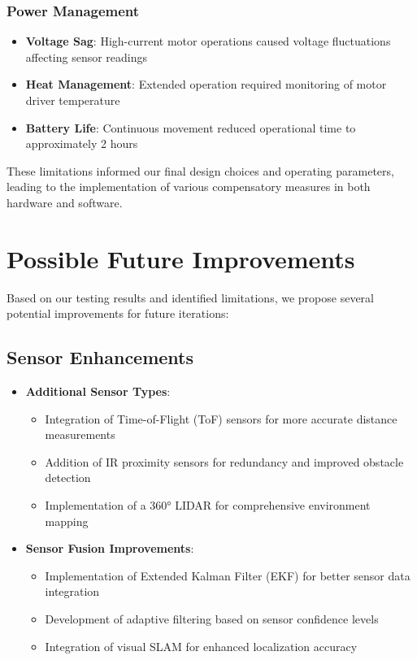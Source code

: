 \documentclass{article}
\begin{document}
\subsubsection{Power Management}
\begin{itemize}
    \item \textbf{Voltage Sag}: High-current motor operations caused voltage fluctuations affecting sensor readings
    \item \textbf{Heat Management}: Extended operation required monitoring of motor driver temperature
    \item \textbf{Battery Life}: Continuous movement reduced operational time to approximately 2 hours
\end{itemize}

These limitations informed our final design choices and operating parameters, leading to the implementation of various compensatory measures in both hardware and software.

\newpage
\section{Possible Future Improvements}
Based on our testing results and identified limitations, we propose several potential improvements for future iterations:

\subsection{Sensor Enhancements}
\begin{itemize}
    \item \textbf{Additional Sensor Types}:
        \begin{itemize}
            \item Integration of Time-of-Flight (ToF) sensors for more accurate distance measurements
            \item Addition of IR proximity sensors for redundancy and improved obstacle detection
            \item Implementation of a 360° LIDAR for comprehensive environment mapping
        \end{itemize}
    
    \item \textbf{Sensor Fusion Improvements}:
        \begin{itemize}
            \item Implementation of Extended Kalman Filter (EKF) for better sensor data integration
            \item Development of adaptive filtering based on sensor confidence levels
            \item Integration of visual SLAM for enhanced localization accuracy
        \end{itemize}
\end{itemize}
\end{document}
